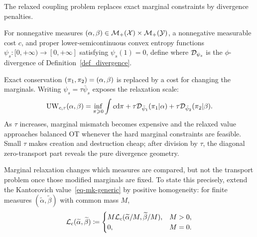 The relaxed coupling problem replaces exact marginal constraints by divergence penalties.
\begin{defn}\label{def-unbalanced-optimal-transport}
For nonnegative measures $(\alpha,\beta) \in \mathcal{M}_+(\mathcal{X}) \times \mathcal{M}_+(\mathcal{Y})$, a nonnegative measurable cost $c$, and proper lower-semicontinuous convex entropy functions $\psi_s:[0,+\infty)\to[0,+\infty]$ satisfying $\psi_s(1)=0$, define
where $\mathcal{D}_{\psi_s}$ is the $\phi$-divergence of Definition~\ref{def_divergence}.
\end{defn}
Exact conservation $(\pi_1,\pi_2)=(\alpha,\beta)$ is replaced by a cost for changing the marginals. Writing $\psi_s=\tau\bar\psi_s$ exposes the relaxation scale:
\[
	\operatorname{UW}_{c,\tau}(\alpha,\beta)
	=
	\inf_{\pi\geqslant0}
	\int c\mathrm{d}\pi
	+
	\tau\mathcal{D}_{\bar\psi_1}(\pi_1|\alpha)
	+
	\tau\mathcal{D}_{\bar\psi_2}(\pi_2|\beta).
\]
As $\tau$ increases, marginal mismatch becomes expensive and the relaxed value approaches balanced OT whenever the hard marginal constraints are feasible. Small $\tau$ makes creation and destruction cheap; after division by $\tau$, the diagonal zero-transport part reveals the pure divergence geometry.

Marginal relaxation changes which measures are compared, but not the transport problem once those modified marginals are fixed. To state this precisely, extend the Kantorovich value~\eqref{eq-mk-generic} by positive homogeneity: for finite measures $(\widetilde\alpha,\widetilde\beta)$ with common mass $M$,
\begin{equation}\label{eq-finite-mass-kantorovich-extension}
	\mathcal{L}_c(\widetilde\alpha,\widetilde\beta)
	\coloneqq
	\begin{cases}
		M\mathcal{L}_c(\widetilde\alpha/M,\widetilde\beta/M),&M>0,\\
		0,&M=0.
	\end{cases}
\end{equation}


